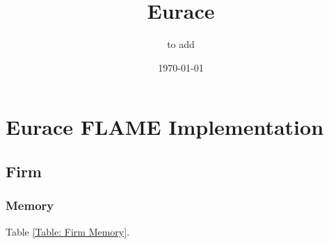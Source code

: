 \documentclass[a4paper,11pt]{article}
\title{Eurace}
\author{to add}
\date{\today}
\begin{document}
\maketitle
\tableofcontents
\clearpage
\section{Eurace FLAME Implementation}
\subsection{Firm}

\subsubsection{Memory}

Table \ref{Table: Firm Memory}.
\end{document}
